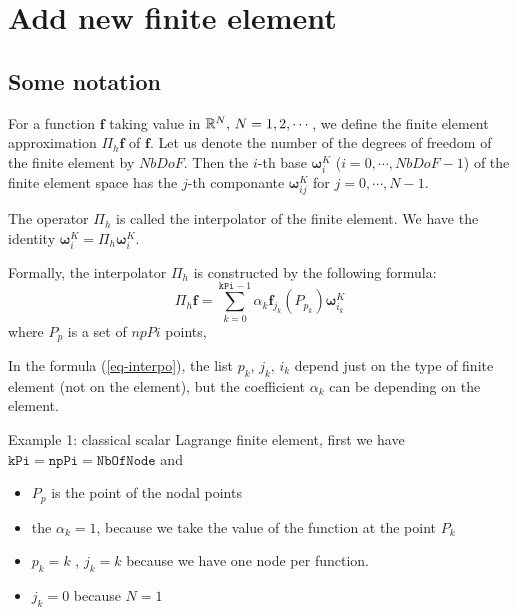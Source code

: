 \section{Add new finite element}

\subsection{Some notation}
\def\Fb#1{\boldsymbol{\omega}^{K}_{#1}}
\def\fbi{\mathbf{\omega}^{K}_{ij}}


For a function $\boldsymbol{f}$ taking value in $\mathbb{R}^{N},\, N=1,2,\cdots$,
we define the finite element approximation $\Pi_h \boldsymbol{f}$ of
$\boldsymbol{f}$.
Let us denote the number of the degrees of freedom of the finite element by 
$NbDoF$.
Then the $i$-th base  $\boldsymbol{\omega}^{K}_{i}$ ($i=0,\cdots,NbDoF-1$) 
of the finite element space has the $j$-th componante
$\mathbf{\omega}^{K}_{ij}$ for $j=0,\cdots,N-1$.
  
The operator  $\Pi_{h}$ is called the interpolator of the finite element.
We have the identity $\boldsymbol{\omega}^{K}_{i} =  \Pi_{h} \boldsymbol{\omega}^{K}_{i} $.

Formally, the interpolator $\Pi_{h}$ is constructed by the following formula:
\begin{equation}
\label{eq-interpo}
\Pi_{h} \boldsymbol{f} = \sum_{k=0}^{\mathtt{kPi}-1} \alpha_k \boldsymbol{f}_{j_{k}}(P_{p_{k}}) \boldsymbol{\omega}^{K}_{i_{k}} 
\end{equation}
where $P_{p}$ is a set of $npPi$ points, 

In the formula (\ref{eq-interpo}), the list $ p_{k},\, j_{k},\, i_{k}$ depend just on  the type of finite element (not on the element), but the coefficient  $\alpha_{k}$ can be depending on the element. 

\medskip
 Example 1: classical scalar  Lagrange finite element, first we have $\mathtt{kPi}=\mathtt{npPi}=\mathtt{NbOfNode}$ and
\begin{itemize}
\item $P_{p}$ is the point of the nodal points
\item  the $\alpha_k=1$, because we take the value  of the function at the point $P_{k}$
\item $p_{k}=k$ ,  $j_{k}=k$ because we have one node per  function.
\item $j_{k}=0$ because $N=1$
\end{itemize}

